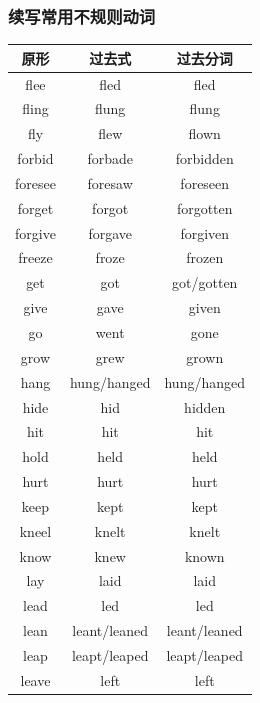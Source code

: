 \subsubsection{续写常用不规则动词}

\begin{center}
\begin{tabular}{c|c|c}
\textbf{原形} & \textbf{过去式} & \textbf{过去分词} \\ \toprule
flee & fled & fled \\
fling & flung & flung \\
fly & flew & flown \\
forbid & forbade & forbidden \\
foresee & foresaw & foreseen \\
forget & forgot & forgotten \\
forgive & forgave & forgiven \\
freeze & froze & frozen \\
get & got & got/gotten \\
give & gave & given \\
go & went & gone \\
grow & grew & grown \\
hang & hung/hanged & hung/hanged \\
hide & hid & hidden \\
hit & hit & hit \\
hold & held & held \\
hurt & hurt & hurt \\
keep & kept & kept \\
kneel & knelt & knelt \\
know & knew & known \\
lay & laid & laid \\
lead & led & led \\
lean & leant/leaned & leant/leaned \\
leap & leapt/leaped & leapt/leaped \\
leave & left & left \\
\bottomrule
\end{tabular}
\end{center}

